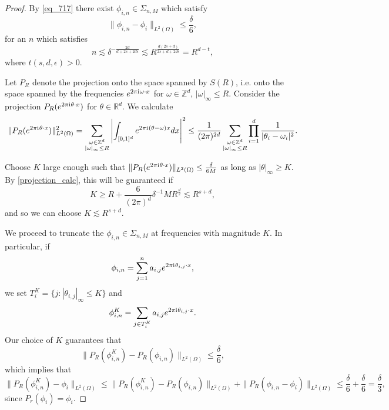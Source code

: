 \begin{proof}
 By \eqref{eq_717}
 there exist $\phi_{i,n}\in \Sigma_{n,M}$ which satisfy
 \begin{equation}
  \|\phi_{i,n} - \phi_i\|_{L^2(\Omega)} \leq \frac{\delta}{6},
 \end{equation}
 for an $n$ which satisfies 
 \begin{equation}
n \lesssim \delta^{-\frac{2d}{d+2s+2d\epsilon}}\lesssim R^{\frac{d(2s+d)}{2s+d+2d\epsilon}} = R^{d-t},
 \end{equation} 
 where $t(s,d,\epsilon) > 0$.
 
 Let $P_R$ denote the projection onto the space spanned by $S(R)$, i.e. onto the space spanned by the frequencies $e^{2\pi {\mathrm{i}\mkern1mu} \omega\cdot x}$ for $\omega\in \mathbb{Z}^d$, $|\omega|_\infty \leq R$. 
 Consider the projection $P_R(e^{2\pi {\mathrm{i}\mkern1mu} \theta\cdot x})$ for $\theta\in \mathbb{R}^d$. We calculate
 \begin{equation}\label{projection_calc}
  \|P_R(e^{2\pi {\mathrm{i}\mkern1mu} \theta\cdot x})\|^2_{L^2(\Omega)} = \sum_{\substack{\omega\in \mathbb{Z}^d\\ |\omega|_\infty \leq R}} \left|\int_{[0,1]^d} e^{2\pi {\mathrm{i}\mkern1mu} (\theta - \omega)x}dx\right|^2 \leq \frac{1}{(2\pi)^{2d}}\sum_{\substack{\omega\in \mathbb{Z}^d\\ |\omega|_\infty \leq R}}\prod_{i=1}^d\frac{1}{|\theta_i - \omega_i|^2}.
 \end{equation}
 
 Choose $K$ large enough such that $\|P_R(e^{2\pi {\mathrm{i}\mkern1mu} \theta\cdot x})\|_{L^2(\Omega)} \leq \frac{\delta}{6M}$ as long as $|\theta|_\infty \geq K$. By \eqref{projection_calc}, this will be guaranteed if
 \begin{equation}
  K \geq R + \frac{6}{(2\pi)^d}\delta^{-1}MR^{\frac{d}{2}} \lesssim R^{s+d},
 \end{equation}
 and so we can choose $K\lesssim R^{s+d}$.

 We proceed to truncate the $\phi_{i,n}\in \Sigma_{n,M}$ at frequencies with magnitude $K$. In particular, if
 \begin{equation}
  \phi_{i,n} = \sum_{j=1}^n a_{i,j}e^{2\pi {\mathrm{i}\mkern1mu} \theta_{i,j}\cdot x},
 \end{equation}
 we set $T^K_i = \{j:|\theta_{i,j}|_\infty \leq K\}$ and 
 \begin{equation}
 \phi^K_{i,n} = \sum_{j\in T^K_i} a_{i,j}e^{2\pi {\mathrm{i}\mkern1mu} \theta_{i,j}\cdot x}.
 \end{equation}
 Our choice of $K$ guarantees that
 \begin{equation}
  \|P_R(\phi_{i,n}^K) - P_R(\phi_{i,n})\|_{L^2(\Omega)} \leq \frac{\delta}{6},
 \end{equation}
 which implies that
 \begin{equation}
  \|P_R(\phi_{i,n}^K) - \phi_i\|_{L^2(\Omega)} \leq \|P_R(\phi_{i,n}^K) - P_R(\phi_{i,n})\|_{L^2(\Omega)} + \|P_R(\phi_{i,n} - \phi_i)\|_{L^2(\Omega)} \leq \frac{\delta}{6} + \frac{\delta}{6} = \frac{\delta}{3},
 \end{equation}
 since $P_r(\phi_i) = \phi_i$.
 

\end{proof}
